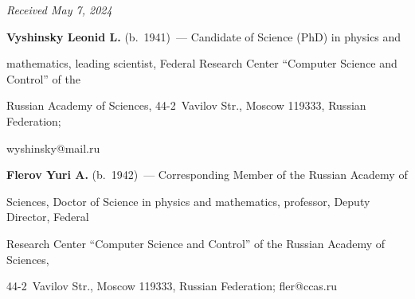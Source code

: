\vspace*{-6pt}





\hfill{\small\textit{Received May 7, 2024}} 





\vspace*{-18pt}





\Contr





\vspace*{-3pt}








      \noindent


      \textbf{Vyshinsky Leonid L.} (b.\ 1941)~--- Candidate of Science (PhD) in physics and 


mathematics, leading scientist, Federal Research Center ``Computer Science and Control'' of the 


Russian Academy of Sciences, 44-2~Vavilov Str., Moscow 119333, Russian Federation; 


\mbox{wyshinsky@mail.ru} 


      


      \vspace*{3pt}


      


      \noindent


      \textbf{Flerov Yuri A.} (b.\ 1942)~--- Corresponding Member of the Russian Academy of 


Sciences, Doctor of Science in physics and mathematics, professor, Deputy Director, Federal 


Research Center ``Computer Science and Control'' of the Russian Academy of Sciences,  


44-2~Vavilov Str., Moscow 119333, Russian Federation; \mbox{fler@ccas.ru}


    





\label{end\stat}





\renewcommand{\bibname}{\protect\rm Литература} 


      


